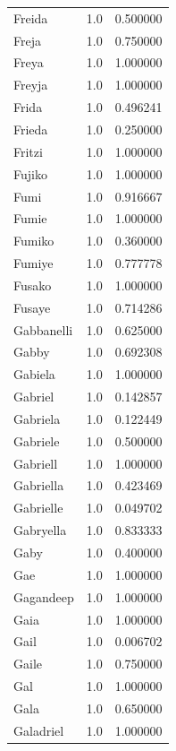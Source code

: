 \documentclass[
  letterpaper,
  DIV=11,
  numbers=noendperiod]{scrreprt}
\begin{document}
\begin{tabular}{lrr}
Freida          &   1.0 &   0.500000 \\
Freja           &   1.0 &   0.750000 \\
Freya           &   1.0 &   1.000000 \\
Freyja          &   1.0 &   1.000000 \\
Frida           &   1.0 &   0.496241 \\
Frieda          &   1.0 &   0.250000 \\
Fritzi          &   1.0 &   1.000000 \\
Fujiko          &   1.0 &   1.000000 \\
Fumi            &   1.0 &   0.916667 \\
Fumie           &   1.0 &   1.000000 \\
Fumiko          &   1.0 &   0.360000 \\
Fumiye          &   1.0 &   0.777778 \\
Fusako          &   1.0 &   1.000000 \\
Fusaye          &   1.0 &   0.714286 \\
Gabbanelli      &   1.0 &   0.625000 \\
Gabby           &   1.0 &   0.692308 \\
Gabiela         &   1.0 &   1.000000 \\
Gabriel         &   1.0 &   0.142857 \\
Gabriela        &   1.0 &   0.122449 \\
Gabriele        &   1.0 &   0.500000 \\
Gabriell        &   1.0 &   1.000000 \\
Gabriella       &   1.0 &   0.423469 \\
Gabrielle       &   1.0 &   0.049702 \\
Gabryella       &   1.0 &   0.833333 \\
Gaby            &   1.0 &   0.400000 \\
Gae             &   1.0 &   1.000000 \\
Gagandeep       &   1.0 &   1.000000 \\
Gaia            &   1.0 &   1.000000 \\
Gail            &   1.0 &   0.006702 \\
Gaile           &   1.0 &   0.750000 \\
Gal             &   1.0 &   1.000000 \\
Gala            &   1.0 &   0.650000 \\
Galadriel       &   1.0 &   1.000000 \\

\end{tabular}
\end{document}
